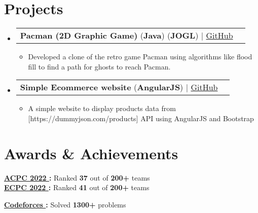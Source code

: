 \documentclass[letterpaper,11pt]{article}
\makeatletter
\newcommand{\resumeItem}[1]{
  \item\small{
    {#1 \vspace{-2pt}}
  }
}
\newcommand{\resumeProjectHeading}[2]{
    \vspace{-2pt}\item
    \begin{tabular*}{0.97\textwidth}{l@{\extracolsep{\fill}}r}
      \small#1 & #2 \\
    \end{tabular*}\vspace{-7pt}
}
\newcommand{\resumeSubHeadingListStart}{\begin{itemize}[leftmargin=0.15in, label={}]}
\newcommand{\resumeSubHeadingListEnd}{\end{itemize}}
\newcommand{\resumeItemListStart}{\begin{itemize}}
\newcommand{\resumeItemListEnd}{\end{itemize}\vspace{-5pt}}
\makeatother
\begin{document}

\section{Projects}
\vspace{3pt}
\resumeSubHeadingListStart


\resumeProjectHeading
{\textbf{Pacman (2D Graphic Game)} (\textbf{Java}) (\textbf{JOGL}) $|$ \href{https://github.com/Yossef-Magdy/Pacman}{GitHub \faLink}}{}
\resumeItemListStart
\resumeItem{Developed a clone of the retro game Pacman using algorithms like flood fill to find a path for ghosts to reach Pacman.}
\resumeItemListEnd

\resumeProjectHeading
{\textbf{Simple Ecommerce website} (\textbf{AngularJS}) $|$ \href{https://github.com/Yossef-Magdy/angular-ecommerce}{GitHub \faLink}}{}
\resumeItemListStart
\resumeItem{A simple website to display products data from [https://dummyjson.com/products] API using AngularJS and Bootstrap}
\resumeItemListEnd

\resumeSubHeadingListEnd





\section{Awards \& Achievements}
  \vspace{2pt}
  \resumeSubHeadingListStart
    \small{\item{
        \textbf{\href{https://drive.google.com/file/d/1kxMcLRh3jysNW1Yy4loKLkkGkbccFPU_/view?usp=drive_link}{ACPC 2022 }:}
        {Ranked \textbf{37} out of \textbf{200+} teams} 
        \\ \vspace{3pt}
		\textbf{\href{https://drive.google.com/file/d/1p7HnOlci6spjWYa2FNIF-FpbT-O8zQ8h/view?usp=drive_link}{ECPC 2022 }:} 
		{Ranked \textbf{41} out of \textbf{200+} teams} 
		\\ \vspace{3pt}
		
		\textbf{{\href{https://codeforces.com/profile/Yossef}{Codeforces }}:}
		{Solved \textbf{1300+} problems} \\ 
		\vspace{3pt}
    }}
  \resumeSubHeadingListEnd
\end{document}

